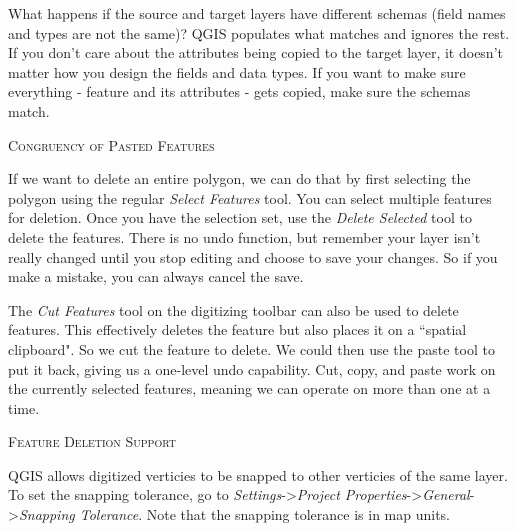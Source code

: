 What happens if the source and target layers have
different schemas (field names and types are not the same)? QGIS populates
what matches and ignores the rest. If you don't care about the attributes
being copied to the target layer, it doesn't matter how you design the
fields and data types. If you want to make sure everything - feature and its
attributes - gets copied, make sure the schemas match.

\begin{Tip}[h]\caption{\textsc{Congruency of Pasted Features}}
\end{Tip}


If we want to delete an entire polygon, we can do that by first selecting 
the polygon using the regular \textsl{Select Features} tool. You can select 
multiple features for deletion. Once you have the selection set, use the 
\textsl{Delete Selected} tool to delete the features. There is no undo function, 
but remember your layer isn't really changed until you stop editing and choose 
to save your changes. So if you make a mistake, you can always cancel the save.

The \textsl{Cut Features} tool on the digitizing toolbar can
also be used to delete features. This effectively deletes the feature but
also places it on a ``spatial clipboard". So we cut the feature to delete. 
We could then use the paste tool to put it back, giving us a one-level undo 
capability. Cut, copy, and paste work on the currently selected features, 
meaning we can operate on more than one at a time.

\begin{Tip}[h]\caption{\textsc{Feature Deletion Support}}
\end{Tip}

QGIS allows digitized verticies to be snapped to other verticies of the same layer. To 
set the snapping tolerance, go to
\textit{Settings}->\textit{Project Properties}->\textit{General}->\textit{Snapping Tolerance}.
Note that the snapping tolerance is in map units.

